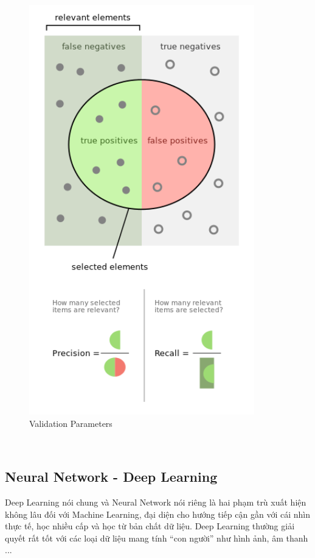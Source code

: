 \begin{figure}[h!]
\centering
\includegraphics[height=7in, keepaspectratio=true]{precision_recall.png}
\caption{Validation Parameters}
\end{figure}\\
\subsection{Neural Network - Deep Learning}
Deep Learning nói chung và Neural Network nói riêng là hai phạm trù xuất hiện 
không lâu đối với Machine Learning, đại diện cho hướng tiếp cận gần với 
cái nhìn thực tế, học nhiều cấp và học từ bản chất dữ liệu. Deep Learning 
thường giải quyết rất tốt với các loại dữ liệu mang tính ``con người'' như 
hình ảnh, âm thanh ... \cite{NeuralNetworksandDeepLearning} 
